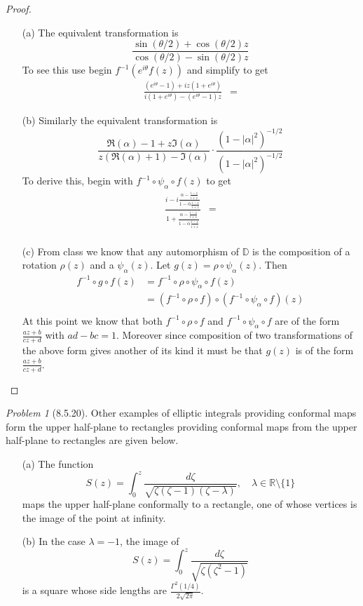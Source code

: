 \documentclass[10pt]{article}
\newcommand{\sk}{\vskip 10mm}
\newcommand{\bb}[1]{\mathbb{#1}}
\newcommand{\conj}[1]{\overline{#1}}
\theoremstyle{remark}
\newtheorem{problem}{Problem}
\theoremstyle{remark}
\begin{document}
\begin{proof}
  \begin{enumerate}
  \item[(a)] The equivalent transformation is
    \[
      \frac{\sin(\theta/2)+\cos(\theta/2)z}{\cos(\theta/2)-\sin(\theta/2)z}
    \]
    To see this use begin $f^{-1}(e^{i\theta}f(z))$ and simplify to get
    \begin{align*}
      \frac{(e^{i\theta}-1)+iz(1+e^{i\theta})}{i(1+e^{i\theta})-(e^{i\theta}-1)z}&=
    \end{align*}
  \item[(b)] Similarly the equivalent transformation is
    \[
      \frac{\Re(\alpha)-1+z\Im(\alpha)}{z(\Re(\alpha)+1)-\Im(\alpha)}\cdot\frac{(1-|\alpha|^2)^{-1/2}}{(1-|\alpha|^2)^{-1/2}}
    \]
    To derive this, begin with $f^{-1}\circ\psi_\alpha\circ f(z)$ to get
    \begin{align*}
      \frac{i-i\frac{\alpha-\frac{i-z}{i+z}}{1-\conj{\alpha}\frac{i-z}{i+z}}}{1+\frac{\alpha-\frac{i-z}{i+z}}{1-\conj{\alpha}\frac{i-z}{i+z}}}&=\\
    \end{align*}
  \item[(c)] From class we know that any automorphism of $\bb{D}$ is the
    composition of a rotation $\rho(z)$ and a $\psi_\alpha(z)$. Let $g(z)=\rho\circ\psi_\alpha(z)$.
    Then
    \begin{align*}
      f^{-1}\circ g\circ f(z) &= f^{-1}\circ\rho\circ\psi_\alpha \circ f(z)\\
                      &= (f^{-1}\circ\rho\circ f)\circ (f^{-1}\circ\psi_\alpha \circ f)(z)\\
    \end{align*}
    At this point we know that both $f^{-1}\circ\rho\circ f$ and $f^{-1}\circ\psi_\alpha \circ f$
    are of the form $\frac{az+b}{cz+d}$ with $ad-bc=1$. Moreover since
    composition of two transformations of the above form gives another of
    its kind it must be that $g(z)$ is of the form $\frac{az+b}{cz+d}$.
  \end{enumerate}
\end{proof}

\sk

\begin{problem}[8.5.20]
  Other examples of elliptic integrals providing conformal maps form the upper
  half-plane to rectangles providing conformal maps from the upper half-plane
  to rectangles are given below.
  \begin{enumerate}
  \item[(a)] The function
    \[
      S(z)=\int_0^z\frac{d\zeta}{\sqrt{\zeta(\zeta-1)(\zeta-\lambda)}},\quad \lambda\in\bb{R}\setminus\{1\}
    \]
    maps the upper half-plane conformally to a rectangle, one of whose vertices
    is the image of the point at infinity.
  \item[(b)] In the case $\lambda=-1$, the image of
    \[
      S(z)=\int_0^z\frac{d\zeta}{\sqrt{\zeta(\zeta^2-1)}}
    \]
    is a square whose side lengths are $\frac{\Gamma^2(1/4)}{2\sqrt{2\pi}}$.
  \end{enumerate}
\end{problem}
\end{document}

